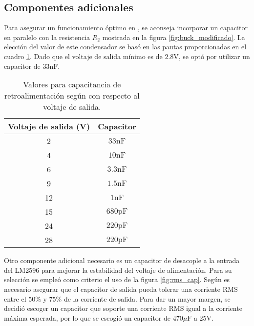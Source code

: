     \subsection{Componentes adicionales}

        Para asegurar un funcionamiento óptimo en \cite{lm2596}, se aconseja incorporar
        un capacitor en paralelo con la resistencia $R_2$ mostrada en la figura
        \ref{fig:buck_modificado}. La elección del valor de este condensador se basó
        en las pautas proporcionadas en el cuadro \ref{tb:feedforward_cap}. 
        Dado que el voltaje de salida mínimo es de $2.8\text{V}$, se optó por utilizar
        un capacitor de $33\text{nF}$.

        \begin{table}[H]
            \centering
            \begin{tabular}{|c|c|}
                \hline
                Voltaje de salida (V) & Capacitor \\
                \hline
                2 & $33\text{nF}$ \\
                4 & $10\text{nF}$ \\
                6 & $3.3\text{nF}$ \\
                9 & $1.5\text{nF}$ \\
                12 & $1\text{nF}$ \\
                15 & $680\text{pF}$ \\
                24 & $220\text{pF}$ \\
                28 & $220\text{pF}$ \\
                \hline
            \end{tabular}
            \caption{Valores para capacitancia de retroalimentación según \cite{lm2596}
                con respecto al voltaje de salida.}
            \label{tb:feedforward_cap}
        \end{table}



        Otro componente adicional necesario es un capacitor de desacople a la entrada
        del LM2596 para mejorar la estabilidad del voltaje de alimentación. Para su
        selección se empleó como criterio el uso de la figura \ref{fig:rms_cap}. Según
        \cite{lm2596} es necesario asegurar que el capacitor de salida pueda tolerar
        una corriente RMS entre el $50\%$ y $75\%$ de la corriente de salida.
        Para dar un mayor margen, se decidió escoger un capacitor que soporte una corriente
        RMS igual a la corriente máxima esperada, por lo que se escogió un capacitor
        de $470\mu\text{F}$ a $25\text{V}$.


